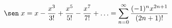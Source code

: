 \documentclass[10pt, a5paper]{article}
\begin{document}
$$
\sen\;x = x - \dfrac{x^3}{3!} + \dfrac{x^5}{5!} - \dfrac{x^7}{7!} + \ldots = \sum^{\infty}_{n = 0} \dfrac{(-1)^{n}x^{2n + 1}}{(2n + 1)!}
$$
\end{document}
